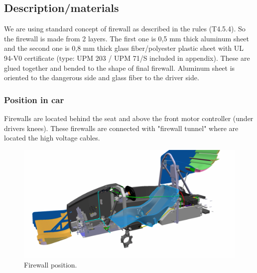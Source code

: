 \subsection{Description/materials}

We are using standard concept of firewall as described in the rules (T4.5.4). So the firewall is made from 2 layers. The first one is 0,5 mm thick aluminum sheet and the second one is 0,8 mm thick glass fiber/polyester plastic sheet with UL 94-V0 certificate (type: UPM 203 / UPM 71/S included in appendix). These are glued together and bended to the shape of final firewall. Aluminum sheet is oriented to the dangerous side and glass fiber to the driver side.
\subsubsection{Position in car}

Firewalls are located behind the seat and above the front motor controller (under drivers knees). These firewalls are connected with "firewall tunnel" where are located the high voltage cables.

\begin{figure}[H]
	\centering
	\includegraphics[width=\textwidth]{./img/Firewall-position.jpg}
	\caption{Firewall position.}
	\label{fig:Firewall-position}
\end{figure}